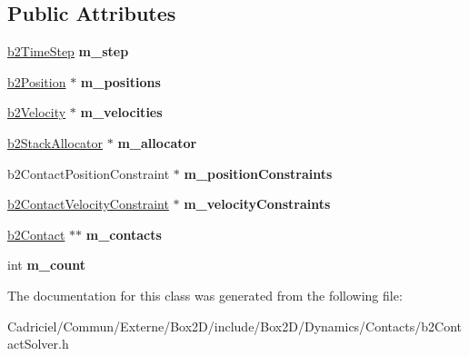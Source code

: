 \subsection*{Public Attributes}
\begin{DoxyCompactItemize}
\item 
\hyperlink{structb2_time_step}{b2\+Time\+Step} {\bfseries m\+\_\+step}\hypertarget{classb2_contact_solver_aac78600ba5fd3249bac20678cbc9f101}{}\label{classb2_contact_solver_aac78600ba5fd3249bac20678cbc9f101}

\item 
\hyperlink{structb2_position}{b2\+Position} $\ast$ {\bfseries m\+\_\+positions}\hypertarget{classb2_contact_solver_a39b973c8311e522f44cda9053dcea5a8}{}\label{classb2_contact_solver_a39b973c8311e522f44cda9053dcea5a8}

\item 
\hyperlink{structb2_velocity}{b2\+Velocity} $\ast$ {\bfseries m\+\_\+velocities}\hypertarget{classb2_contact_solver_aae6dae9341dbbd780e7b3ec6b1b332f9}{}\label{classb2_contact_solver_aae6dae9341dbbd780e7b3ec6b1b332f9}

\item 
\hyperlink{classb2_stack_allocator}{b2\+Stack\+Allocator} $\ast$ {\bfseries m\+\_\+allocator}\hypertarget{classb2_contact_solver_a6a2c9f5470a469e50d7f33f8d9095abe}{}\label{classb2_contact_solver_a6a2c9f5470a469e50d7f33f8d9095abe}

\item 
b2\+Contact\+Position\+Constraint $\ast$ {\bfseries m\+\_\+position\+Constraints}\hypertarget{classb2_contact_solver_ac0f4106f7cf67d185a7a4f3fd5a4e4ce}{}\label{classb2_contact_solver_ac0f4106f7cf67d185a7a4f3fd5a4e4ce}

\item 
\hyperlink{structb2_contact_velocity_constraint}{b2\+Contact\+Velocity\+Constraint} $\ast$ {\bfseries m\+\_\+velocity\+Constraints}\hypertarget{classb2_contact_solver_a616319ffa7ceb509b8189f07a070f7c7}{}\label{classb2_contact_solver_a616319ffa7ceb509b8189f07a070f7c7}

\item 
\hyperlink{classb2_contact}{b2\+Contact} $\ast$$\ast$ {\bfseries m\+\_\+contacts}\hypertarget{classb2_contact_solver_aa1c7370d1d2681f9d49a494f9b0a38c6}{}\label{classb2_contact_solver_aa1c7370d1d2681f9d49a494f9b0a38c6}

\item 
int {\bfseries m\+\_\+count}\hypertarget{classb2_contact_solver_ab5b74c0fadf0d5d8997700b5ff91ea91}{}\label{classb2_contact_solver_ab5b74c0fadf0d5d8997700b5ff91ea91}

\end{DoxyCompactItemize}


The documentation for this class was generated from the following file\+:\begin{DoxyCompactItemize}
\item 
Cadriciel/\+Commun/\+Externe/\+Box2\+D/include/\+Box2\+D/\+Dynamics/\+Contacts/b2\+Contact\+Solver.\+h\end{DoxyCompactItemize}
